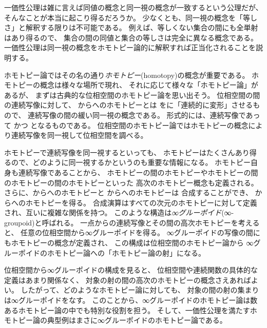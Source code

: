 \documentclass[index]{subfiles}
\begin{document}

一価性公理は雑に言えば同値の概念と同一視の概念が一致するという公理だが、
そんなことが本当に起こり得るだろうか。
少なくとも、同一視の概念を「等しさ」と解釈する限りは不可能である。
例えば、等しくない集合の間にも全単射はあり得るので、
集合の間の同値と集合の等しさは完全に異なる概念である。
一価性公理は同一視の概念をホモトピー論的に解釈すれば正当化されることを説明する。

ホモトピー論ではその名の通り\emph{ホモトピー}(homotopy)の概念が重要である。
ホモトピーの概念は様々な場所で現れ、
それに応じて様々な「ホモトピー論」があるが、
まずは古典的な位相空間のホモトピー論を思い出そう。
位相空間の間の連続写像に対して、
からへのホモトピーとは
をに「連続的に変形」させるもので、
連続写像の間の緩い同一視の概念である。
形式的には、連続写像であって
かつ
となるものである。
位相空間のホモトピー論ではホモトピーの概念により連続写像を同一視して位相空間を調べる。

ホモトピーで連続写像を同一視するといっても、
ホモトピーはたくさんあり得るので、どのように同一視するかというのも重要な情報になる。
ホモトピー自身も連続写像であることから、
ホモトピーの間のホモトピーやホモトピーの間のホモトピーの間のホモトピーといった
高次のホモトピー概念も定義される。
さらに、からへのホモトピーと
からへのホモトピーは
合成することができ、
からへのホモトピーを得る。
合成演算はすべての次元のホモトピーに対して定義され、互いに複雑な関係を持つ。
このような構造は\emph{∞グルーポイド}(∞-groupoid)と呼ばれる。
一点からの連続写像とその間の高次ホモトピーを考えると、
任意の位相空間から∞グルーポイドを得る。
∞グルーポイドの写像の間にもホモトピーの概念が定義され、
この構成は位相空間のホモトピー論から
∞グルーポイドのホモトピー論への「ホモトピー論の射」になる。

位相空間から∞グルーポイドの構成を見ると、
位相空間や連続関数の具体的な定義はあまり関係なく、
対象の射の間の高次のホモトピーの概念さえあればよい。
したがって、どのようなホモトピー論に対しても、
対象の間の射の集まりは∞グルーポイドをなす。
このことから、∞グルーポイドのホモトピー論は数あるホモトピー論の中でも特別な役割を担う。
そして、一価性公理を満たすホモトピー論の典型例はまさに∞グルーポイドのホモトピー論である。
\end{document}
